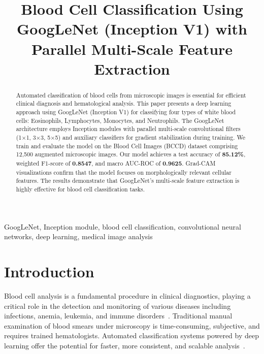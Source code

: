 \documentclass[conference]{IEEEtran}
\begin{document}
\title{Blood Cell Classification Using GoogLeNet (Inception V1) with Parallel Multi-Scale Feature Extraction}

\author{
}

\maketitle

\begin{abstract}
Automated classification of blood cells from microscopic images is essential for efficient clinical diagnosis and hematological analysis. This paper presents a deep learning approach using GoogLeNet (Inception V1) for classifying four types of white blood cells: Eosinophils, Lymphocytes, Monocytes, and Neutrophils. The GoogLeNet architecture employs Inception modules with parallel multi-scale convolutional filters (1$\times$1, 3$\times$3, 5$\times$5) and auxiliary classifiers for gradient stabilization during training. We train and evaluate the model on the Blood Cell Images (BCCD) dataset comprising 12,500 augmented microscopic images. Our model achieves a test accuracy of \textbf{85.12\%}, weighted F1-score of \textbf{0.8547}, and macro AUC-ROC of \textbf{0.9625}. Grad-CAM visualizations confirm that the model focuses on morphologically relevant cellular features. The results demonstrate that GoogLeNet's multi-scale feature extraction is highly effective for blood cell classification tasks.
\end{abstract}

\begin{IEEEkeywords}
GoogLeNet, Inception module, blood cell classification, convolutional neural networks, deep learning, medical image analysis
\end{IEEEkeywords}

\section{Introduction}

Blood cell analysis is a fundamental procedure in clinical diagnostics, playing a critical role in the detection and monitoring of various diseases including infections, anemia, leukemia, and immune disorders~\cite{acevedo2020recognition}. Traditional manual examination of blood smears under microscopy is time-consuming, subjective, and requires trained hematologists. Automated classification systems powered by deep learning offer the potential for faster, more consistent, and scalable analysis~\cite{lecun2015deep}.
\end{document}
